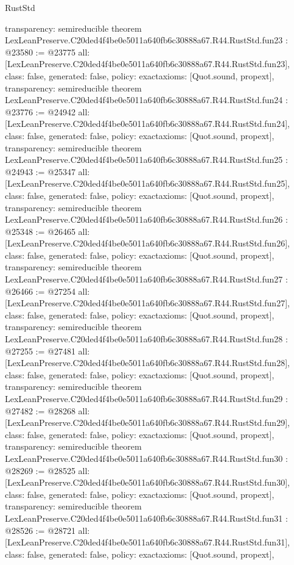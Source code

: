 \begin{lexlean}{RustStd}
\begin{coremodule}
{  transparency: semireducible
}
theorem LexLeanPreserve.C20ded4f4be0e5011a640fb6c30888a67.R44.RustStd.fun23 : @23580 := @23775 {
  all: [LexLeanPreserve.C20ded4f4be0e5011a640fb6c30888a67.R44.RustStd.fun23],
  class: false,
  generated: false,
  policy: exact{axioms: [Quot.sound, propext]},
  transparency: semireducible
}
theorem LexLeanPreserve.C20ded4f4be0e5011a640fb6c30888a67.R44.RustStd.fun24 : @23776 := @24942 {
  all: [LexLeanPreserve.C20ded4f4be0e5011a640fb6c30888a67.R44.RustStd.fun24],
  class: false,
  generated: false,
  policy: exact{axioms: [Quot.sound, propext]},
  transparency: semireducible
}
theorem LexLeanPreserve.C20ded4f4be0e5011a640fb6c30888a67.R44.RustStd.fun25 : @24943 := @25347 {
  all: [LexLeanPreserve.C20ded4f4be0e5011a640fb6c30888a67.R44.RustStd.fun25],
  class: false,
  generated: false,
  policy: exact{axioms: [Quot.sound, propext]},
  transparency: semireducible
}
theorem LexLeanPreserve.C20ded4f4be0e5011a640fb6c30888a67.R44.RustStd.fun26 : @25348 := @26465 {
  all: [LexLeanPreserve.C20ded4f4be0e5011a640fb6c30888a67.R44.RustStd.fun26],
  class: false,
  generated: false,
  policy: exact{axioms: [Quot.sound, propext]},
  transparency: semireducible
}
theorem LexLeanPreserve.C20ded4f4be0e5011a640fb6c30888a67.R44.RustStd.fun27 : @26466 := @27254 {
  all: [LexLeanPreserve.C20ded4f4be0e5011a640fb6c30888a67.R44.RustStd.fun27],
  class: false,
  generated: false,
  policy: exact{axioms: [Quot.sound, propext]},
  transparency: semireducible
}
theorem LexLeanPreserve.C20ded4f4be0e5011a640fb6c30888a67.R44.RustStd.fun28 : @27255 := @27481 {
  all: [LexLeanPreserve.C20ded4f4be0e5011a640fb6c30888a67.R44.RustStd.fun28],
  class: false,
  generated: false,
  policy: exact{axioms: [Quot.sound, propext]},
  transparency: semireducible
}
theorem LexLeanPreserve.C20ded4f4be0e5011a640fb6c30888a67.R44.RustStd.fun29 : @27482 := @28268 {
  all: [LexLeanPreserve.C20ded4f4be0e5011a640fb6c30888a67.R44.RustStd.fun29],
  class: false,
  generated: false,
  policy: exact{axioms: [Quot.sound, propext]},
  transparency: semireducible
}
theorem LexLeanPreserve.C20ded4f4be0e5011a640fb6c30888a67.R44.RustStd.fun30 : @28269 := @28525 {
  all: [LexLeanPreserve.C20ded4f4be0e5011a640fb6c30888a67.R44.RustStd.fun30],
  class: false,
  generated: false,
  policy: exact{axioms: [Quot.sound, propext]},
  transparency: semireducible
}
theorem LexLeanPreserve.C20ded4f4be0e5011a640fb6c30888a67.R44.RustStd.fun31 : @28526 := @28721 {
  all: [LexLeanPreserve.C20ded4f4be0e5011a640fb6c30888a67.R44.RustStd.fun31],
  class: false,
  generated: false,
  policy: exact{axioms: [Quot.sound, propext]},
}
\end{coremodule}
\end{lexlean}
